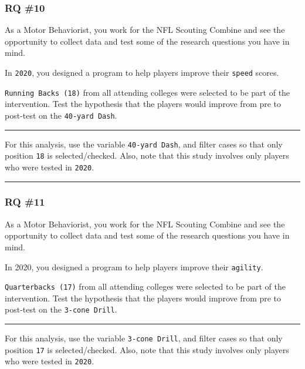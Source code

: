 \documentclass[
]{article}
\begin{document}
\hypertarget{rq-10}{%
\subsubsection{RQ \#10}\label{rq-10}}

As a Motor Behaviorist, you work for the NFL Scouting Combine and see the opportunity to collect data and test some of the research questions you have in mind.

In \texttt{2020}, you designed a program to help players improve their \texttt{speed} scores.

\texttt{Running\ Backs\ (18)} from all attending colleges were selected to be part of the intervention. Test the hypothesis that the players would improve from pre to post-test on the \texttt{40-yard\ Dash}.

\begin{center}\rule{0.5\linewidth}{0.5pt}\end{center}

For this analysis, use the variable \texttt{40-yard\ Dash}, and filter cases so that only position \texttt{18} is selected/checked. Also, note that this study involves only players who were tested in \texttt{2020}.

\begin{center}\rule{0.5\linewidth}{0.5pt}\end{center}

\hypertarget{rq-11}{%
\subsubsection{RQ \#11}\label{rq-11}}

As a Motor Behaviorist, you work for the NFL Scouting Combine and see the opportunity to collect data and test some of the research questions you have in mind.

In 2020, you designed a program to help players improve their \texttt{agility}.

\texttt{Quarterbacks\ (17)} from all attending colleges were selected to be part of the intervention. Test the hypothesis that the players would improve from pre to post-test on the \texttt{3-cone\ Drill}.

\begin{center}\rule{0.5\linewidth}{0.5pt}\end{center}

For this analysis, use the variable \texttt{3-cone\ Drill}, and filter cases so that only position \texttt{17} is selected/checked. Also, note that this study involves only players who were tested in \texttt{2020}.
\end{document}
